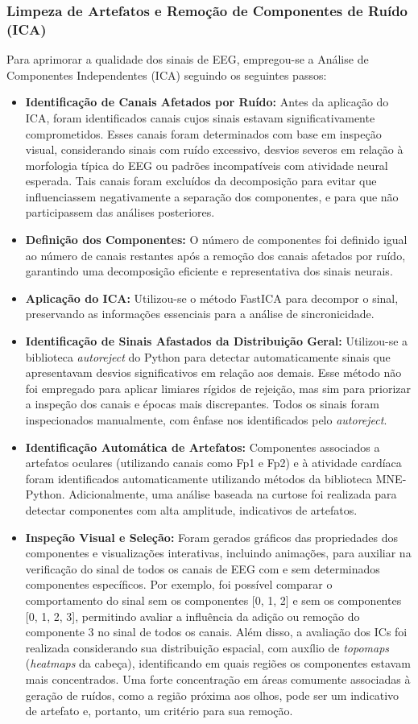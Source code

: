 \subsubsection{Limpeza de Artefatos e Remoção de Componentes de Ruído (ICA)}
Para aprimorar a qualidade dos sinais de EEG, empregou-se a Análise de Componentes Independentes (ICA) seguindo os seguintes passos:
\begin{itemize}
    \item \textbf{Identificação de Canais Afetados por Ruído:} Antes da aplicação do ICA, foram identificados canais cujos sinais estavam significativamente comprometidos. Esses canais foram determinados com base em inspeção visual, considerando sinais com ruído excessivo, desvios severos em relação à morfologia típica do EEG ou padrões incompatíveis com atividade neural esperada. Tais canais foram excluídos da decomposição para evitar que influenciassem negativamente a separação dos componentes, e para que não participassem das análises posteriores.
    \item \textbf{Definição dos Componentes:} O número de componentes foi definido igual ao número de canais restantes após a remoção dos canais afetados por ruído, garantindo uma decomposição eficiente e representativa dos sinais neurais. 
    \item \textbf{Aplicação do ICA:} Utilizou-se o método FastICA para decompor o sinal, preservando as informações essenciais para a análise de sincronicidade. 
    \item \textbf{Identificação de Sinais Afastados da Distribuição Geral:} Utilizou-se a biblioteca \textit{autoreject} do Python para detectar automaticamente sinais que apresentavam desvios significativos em relação aos demais. Esse método não foi empregado para aplicar limiares rígidos de rejeição, mas sim para priorizar a inspeção dos canais e épocas mais discrepantes. Todos os sinais foram inspecionados manualmente, com ênfase nos identificados pelo \textit{autoreject}.
    \item \textbf{Identificação Automática de Artefatos:} Componentes associados a artefatos oculares (utilizando canais como Fp1 e Fp2) e à atividade cardíaca foram identificados automaticamente utilizando métodos da biblioteca MNE-Python. Adicionalmente, uma análise baseada na curtose foi realizada para detectar componentes com alta amplitude, indicativos de artefatos. 
    \item \textbf{Inspeção Visual e Seleção:} Foram gerados gráficos das propriedades dos componentes e visualizações interativas, incluindo animações, para auxiliar na verificação do sinal de todos os canais de EEG com e sem determinados componentes específicos. Por exemplo, foi possível comparar o comportamento do sinal sem os componentes [0, 1, 2] e sem os componentes [0, 1, 2, 3], permitindo avaliar a influência da adição ou remoção do componente 3 no sinal de todos os canais. Além disso, a avaliação dos ICs foi realizada considerando sua distribuição espacial, com auxílio de \textit{topomaps} (\textit{heatmaps} da cabeça), identificando em quais regiões os componentes estavam mais concentrados. Uma forte concentração em áreas comumente associadas à geração de ruídos, como a região próxima aos olhos, pode ser um indicativo de artefato e, portanto, um critério para sua remoção.

\end{itemize}
